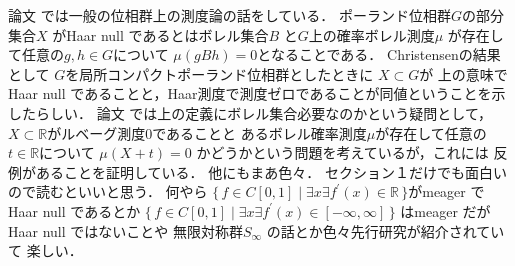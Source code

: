 \documentclass[leqno, a4paper, 12pt]{jsarticle}
\newcommand{\rr}{\mathbb{R}}
\begin{document}
論文
\cite{MR3176143}
では一般の位相群上の測度論の話をしている．
ポーランド位相群$G$の部分集合$X$
がHaar null であるとはボレル集合$B$
と$G$上の確率ボレル測度$\mu$
が存在して任意の$g, h\in G$について
$\mu(gBh)=0$となることである．
Christensenの結果として
$G$を局所コンパクトポーランド位相群としたときに
$X\subset G$が
上の意味でHaar null 
であることと，Haar測度で測度ゼロであることが同値ということを示したらしい．
論文
\cite{MR3176143}では上の定義にボレル集合必要なのかという疑問として，
$X\subset \rr$がルベーグ測度0であることと
あるボレル確率測度$\mu$が存在して任意の$t\in \rr$について
$\mu(X+t)=0$
かどうかという問題を考えているが，これには
反例があることを証明している．
他にもまあ色々．
セクション１だけでも面白いので読むといいと思う．
何やら
$\{\,f\in C[0, 1]\mid \exists x  \exists f^{\prime}(x)\in \rr\, \}$がmeager でHaar null 
であるとか
$\{\,f\in C[0, 1]\mid \exists x  \exists f^{\prime}(x)\in [-\infty, \infty]\, \}$
はmeager だがHaar null ではないことや
無限対称群$S_{\infty}$
の話とか色々先行研究が紹介されていて
楽しい．
\nocite{*}


\end{document}

